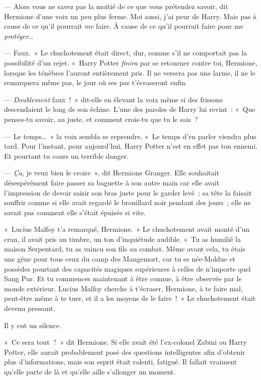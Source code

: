 --- Alors vous ne savez pas la moitié de ce que vous prétendez savoir, dit Hermione d'une voix un peu plus ferme.
Moi aussi, j'ai peur de Harry.
Mais pas à cause de ce qu'il pourrait \emph{me} faire.
À cause de ce qu'il pourrait faire pour me \emph{protéger}…

--- Faux.~»
Le chuchotement était direct, dur, comme s'il ne comportait pas la possibilité d'un rejet.
«~Harry Potter \emph{finira} par se retourner contre toi, Hermione, lorsque les ténèbres l'auront entièrement pris.
Il ne versera pas une larme, il ne le remarquera même pas, le jour où ses pas t'écraseront enfin.

--- \emph{Doublement} faux~!~»
dit-elle en élevant la voix même si des frissons descendaient le long de son échine.
L'une des paroles de Harry lui revint~: «~Que penses-tu savoir, au juste, et comment crois-tu que tu le sais~?

--- Le temps…~»
la voix sembla se reprendre.
«~Le temps d'en parler viendra plus tard.
Pour l'instant, pour aujourd'hui, Harry Potter n'est en effet pas ton ennemi.
Et pourtant tu cours un terrible danger.

--- \emph{Ça}, je veux bien le croire~», dit Hermione Granger.
Elle souhaitait désespérément faire passer sa baguette à son autre main car elle avait l'impression de devoir saisir son bras juste pour le garder levé~; sa tête la faisait souffrir comme si elle avait regardé le brouillard noir pendant des jours~; elle ne savait pas comment elle s'était épuisée si vite.

«~Lucius Malfoy t'a remarqué, Hermione.~»
Le chuchotement avait monté d'un cran, il avait pris un timbre, un ton d'inquiétude audible.
«~Tu as humilié la maison Serpentard, tu as vaincu son fils au combat.
Même avant cela, tu étais une gêne pour tous ceux du camp des Mangemort, car tu es née-Moldue et possèdes pourtant des capacités magiques supérieures à celles de n'importe quel Sang Pur.
Et tu commences maintenant à être connue, à être observée par le monde extérieur.
Lucius Malfoy cherche à t'écraser, Hermione, à te faire mal, peut-être même à te tuer, et il a les moyens de le faire~!~»
Le chuchotement était devenu pressant.

Il y eut un silence.

«~Ce sera tout~?~»
dit Hermione.
Si elle avait été l'ex-colonel Zabini ou Harry Potter, elle aurait probablement posé des questions intelligentes afin d'obtenir plus d'informations, mais son esprit était ralenti, fatigué.
Il fallait vraiment qu'elle parte de là et qu'elle aille s'allonger un moment.


